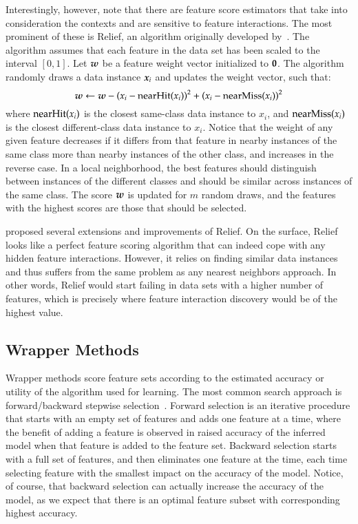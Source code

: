 \begin{refsection}
Interestingly, however, note that there are feature score estimators that take into consideration the contexts and are sensitive to feature interactions. The most prominent of these is Relief, an algorithm originally developed by~\citet{Kira1992}. The algorithm assumes that each feature in the data set has been scaled to the interval $[0,1]$. Let $\boldsymbol{w}$ be a feature weight vector initialized to $\boldsymbol{0}$. The algorithm randomly draws a data instance $\boldsymbol{x}_i$ and updates the weight vector, such that:
$$
\boldsymbol{w}\gets\boldsymbol{w}-\left(x_i - {\rm nearHit}(x_i)\right)^2 + \left(x_i - {\rm nearMiss}(x_i)\right)^2
$$
where ${\rm nearHit}(x_i)$ is the closest same-class data instance to $x_i$, and ${\rm nearMiss}(x_i)$ is the closest different-class data instance to $x_i$. Notice that the weight of any given feature decreases if it differs from that feature in nearby instances of the same class more than nearby instances of the other class, and increases in the reverse case. In a local neighborhood, the best features should distinguish between instances of the different classes and should be similar across instances of the same class. The score $\boldsymbol{w}$ is updated for $m$ random draws, and the features with the highest scores are those that should be selected. 

\citet{Kononenko1997} proposed several extensions and improvements of Relief. On the surface, Relief looks like a perfect feature scoring algorithm that can indeed cope with any hidden feature interactions. However, it relies on finding similar data instances and thus suffers from the same problem as any nearest neighbors approach. In other words, Relief would start failing in data sets with a higher number of features, which is precisely where feature interaction discovery would be of the highest value.

\subsection*{Wrapper Methods}

Wrapper methods score feature sets according to the estimated accuracy or utility of the algorithm used for learning. The most common search approach is forward/backward stepwise selection~\citep{Guyon2003}. Forward selection is an iterative procedure that starts with an empty set of features and adds one feature at a time, where the benefit of adding a feature is observed in raised accuracy of the inferred model when that feature is added to the feature set. Backward selection starts with a full set of features, and then eliminates one feature at the time, each time selecting feature with the smallest impact on the accuracy of the model. Notice, of course, that backward selection can actually increase the accuracy of the model, as we expect that there is an optimal feature subset with corresponding highest accuracy.


\end{refsection}
